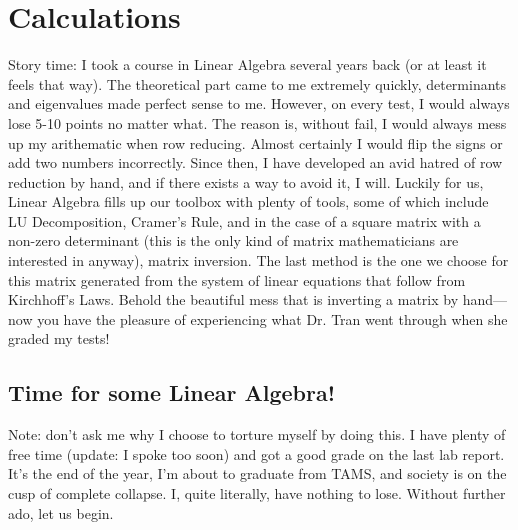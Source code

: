 \documentclass{article}
\begin{document}
\section{Calculations}
Story time: I took a course in Linear Algebra several years back (or at least it feels that way). The theoretical part came to me extremely quickly, 
determinants and eigenvalues made perfect sense to me. However, on every test, I would always lose 5-10 points no matter what. The reason is, without fail, I would
always mess up my arithematic when row reducing. Almost certainly I would flip the signs or add two numbers incorrectly. Since then, I have developed
an avid hatred of row reduction by hand, and if there exists a way to avoid it,  I will. Luckily for us, Linear Algebra fills up our toolbox with plenty of tools, some of which include LU Decomposition, Cramer's Rule, and in the case
of a square matrix with a non-zero determinant (this is the only kind of matrix mathematicians are interested in anyway), matrix inversion. The last method is the one we choose for this matrix generated from the system of linear equations that follow
from Kirchhoff's Laws. Behold the beautiful mess that is inverting a matrix by hand— now you have the pleasure of experiencing
what Dr. Tran went through when she graded my tests!
\subsection*{Time for some Linear Algebra!}
Note: don't ask me why I choose to torture myself by doing this. I have plenty of free time (update: I spoke too soon) and got a good grade on the last lab report. It's the end of the year, I'm about to graduate from TAMS, and
society is on the cusp of complete collapse. 
I, quite literally, have nothing to lose. Without further ado, let us begin. 
\end{document}
